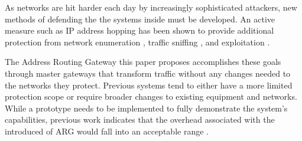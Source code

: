 \label{chp:conclusion}

\begin{comment}
\lettrine{T}{here} are two distinct parts here:

\par Conclusions: Re-state what you have done, summarize the results that you got,
and summarize the key conclusions that you can draw from your results. All of
this is a summary of the entire thesis, and there should be absolutely nothing new
here that hasn’t already been covered in the previous chapters. (It will probably
be presented in a more concise form, however—don’t just cut-and-paste from
previous chapters).

\par Recommendations: Think of this as a description of what should be done in any
follow-on work (as if a student is picking up where you left off, and you need to
tell them what they could/should look at). I’ve found that a bulleted list of
recommendations often works well, where each bullet is a paragraph (or two)
describing a particular recommendation that you have. Don’t be afraid to point
out the shortcomings of your work, and describe what would need to be done to
overcome these shortcomings. (Doing so shows that you understand the limits of
your research, and comes off far better than trying to pretend that your research
has solved every problem, when it really hasn’t). Much of what is covered here
will have already been stated in the analysis of Chapter 4. However, it’s OK to
have some new concepts here that aren’t explicitly described elsewhere.
\end{comment}

\par As networks are hit harder each day by increasingly sophisticated attackers, new methods of defending the the systems inside must be developed. An active measure such as IP address hopping has been shown to provide additional protection from network enumeration \cite{NAH}, traffic sniffing \cite{BBNDYNAT}, and exploitation \cite{APOD}.

\par The Address Routing Gateway this paper proposes accomplishes these goals through master gateways that transform traffic without any changes needed to the networks they protect. Previous systems tend to either have a more limited protection scope or require broader changes to existing equipment and networks. While a prototype needs to be implemented to fully demonstrate the system's capabilities, previous work indicates that the overhead associated with the introduced of ARG would fall into an acceptable range \cite{NAH}.

